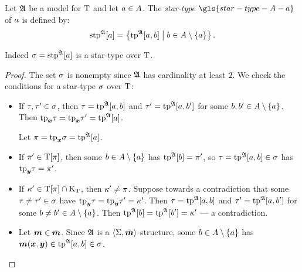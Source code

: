 \begin{definition}
Let $\mathfrak{A}$ be a model for $\mathrm{T}$
and let $a\in A$.
The \emph{star-type} $\gls{star-type-A-a}$ of $a$ is defined by:
\[
  \operatorname{stp}^{\mathfrak{A}}[a] = \left\{\operatorname{tp}^{\mathfrak{A}}[a,b]\mathrel{}\middle|\mathrel{}b \in A \setminus \left\{a\right\}\right\}.
\]
\end{definition}
\begin{remark}
Indeed $\sigma = \operatorname{stp}^{\mathfrak{A}}[a]$ is a star-type over $\mathrm{T}$.
\end{remark}
\begin{proof}
The set $\sigma$ is nonempty since $\mathfrak{A}$ has cardinality at least $2$.
We check the conditions for a star-type $\sigma$ over $\mathrm{T}$:
\begin{itemize}
  \item[\refcondstpx]
  If $\tau,{\tau'}\in\sigma$,
  then $\tau=\operatorname{tp}^{\mathfrak{A}}[a,b]$ and ${\tau'}=\operatorname{tp}^{\mathfrak{A}}[a,{b'}]$ for some
  $b,{b'}\in A\setminus\left\{a\right\}$.
  Then $\mathrm{tp}_{\bm{x}}\tau = \mathrm{tp}_{\bm{x}}{\tau'} = \operatorname{tp}^{\mathfrak{A}}[a]$.
  
  Let $\pi = \mathrm{tp}_{\bm{x}}\sigma = \operatorname{tp}^{\mathfrak{A}}[a]$.
  \item[\refcondstppy]
  If ${\pi'}\in\mathrm{T}[\pi]$,
  then some $b\in A\setminus\left\{a\right\}$ has $\operatorname{tp}^{\mathfrak{A}}[b] = {\pi'}$, so
  $\tau = \operatorname{tp}^{\mathfrak{A}}[a,b] \in \sigma$ has $\mathrm{tp}_{\bm{y}}\tau = {\pi'}$.
  \item[\refcondstpky]
  If ${\kappa'}\in\mathrm{T}[\pi]\cap{\mathrm{K}}_{\mathrm{T}}$, then ${\kappa'}\neq\pi$.
  Suppose towards a contradiction that some $\tau\neq{\tau'}\in\sigma$ have
  $\mathrm{tp}_{\bm{y}}\tau=\mathrm{tp}_{\bm{y}}{\tau'}={\kappa'}$.
  Then $\tau=\operatorname{tp}^{\mathfrak{A}}[a,b]$ and ${\tau'}=\operatorname{tp}^{\mathfrak{A}}[a,{b'}]$ for some
  $b\neq{b'}\in A\setminus\left\{a\right\}$.
  Then $\operatorname{tp}^{\mathfrak{A}}[b]=\operatorname{tp}^{\mathfrak{A}}[{b'}]={\kappa'}$ --- a contradiction.
  \item[\refcondstpm]
  Let $\bm{m}\in\bar{\bm{m}}$.
  Since $\mathfrak{A}$ is a $\left\langle \mathrm{\Sigma},\bar{\bm{m}} \right\rangle$-structure, some $b\in A\setminus\left\{a\right\}$
  has $\bm{m}(\bm{x},\bm{y}) \in \operatorname{tp}^{\mathfrak{A}}[a,b] \in \sigma$.
\end{itemize}
\end{proof}

